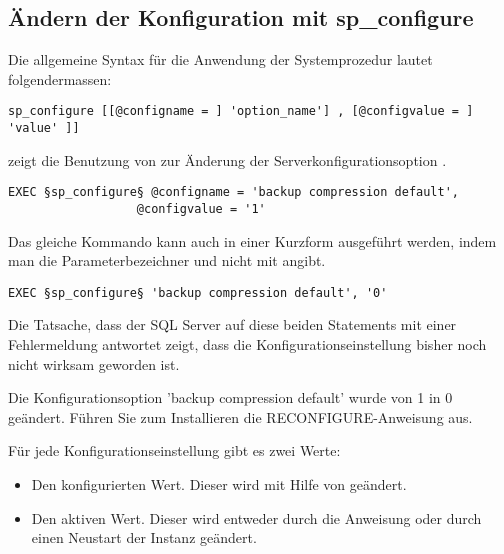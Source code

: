       \subsection{Ändern der Konfiguration mit sp\_configure}
        Die allgemeine Syntax für die Anwendung der Systemprozedur
         lautet folgendermassen:
        \begin{lstlisting}[language=ms_sql,caption={Die Syntax von
sp\_configure},label=admin03_01]
sp_configure [[@configname = ] 'option_name'] , [@configvalue = ] 'value' ]]
          \end{lstlisting}
         zeigt die Benutzung von
         zur Änderung der
        Serverkonfigurationsoption .
        \begin{lstlisting}[language=ms_sql,caption={Ein erstes Beispiel zur
          Nutzung von sp\_configure},label=admin03_02]
EXEC §sp_configure§ @configname = 'backup compression default', 
                  @configvalue = '1'
          \end{lstlisting}
        Das gleiche Kommando kann auch in einer Kurzform ausgeführt werden,
        indem man die Parameterbezeichner  und
         nicht mit angibt.
        \begin{lstlisting}[language=ms_sql,caption={Die Kurzform der Syntax
          für sp\_configure},label=admin03_03]
EXEC §sp_configure§ 'backup compression default', '0'
          \end{lstlisting}
        Die Tatsache, dass der SQL Server auf diese beiden Statements mit einer
        Fehlermeldung antwortet zeigt, dass die Konfigurationseinstellung
        bisher noch nicht wirksam geworden ist.
        \begin{small}
          \begin{mssql}
Die Konfigurationsoption 'backup compression default' wurde von 1 in
0 geändert. Führen Sie zum Installieren die RECONFIGURE-Anweisung
aus.
            \end{mssql}
        \end{small}
        Für jede Konfigurationseinstellung gibt es zwei Werte:
        \begin{itemize}
            \item Den konfigurierten Wert. Dieser wird mit Hilfe von
             geändert.
            \item Den aktiven Wert. Dieser wird entweder durch die Anweisung
             oder durch einen Neustart der Instanz
            geändert.
        \end{itemize}
